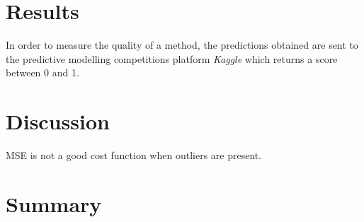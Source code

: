 \documentclass[10pt,conference,compsocconf]{IEEEtran}
\begin{document}



\section{Results}
In order to measure the quality of a method, the predictions obtained are sent to the predictive modelling competitions platform \textit{Kaggle} which returns a score between 0 and 1.\\
\section{Discussion}
MSE is not a good cost function
when outliers are present.
\section{Summary}

%






\end{document}
